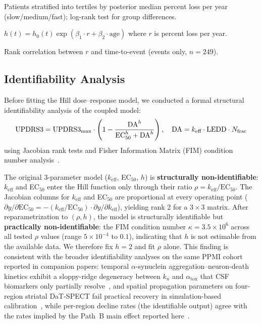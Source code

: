 \begin{description}[style=unboxed, leftmargin=0pt]
  \item[C1. Kaplan--Meier:] Patients stratified into tertiles by
    posterior median percent loss per year (slow/medium/fast);
    log-rank test for group differences.

  \item[C2. Cox PH:] $h(t) = h_0(t) \exp(\beta_1 \cdot r +
    \beta_2 \cdot \text{age})$ where $r$ is percent loss per year.

  \item[C4. Spearman:] Rank correlation between $r$ and time-to-event
    (events only, $n{=}249$).
\end{description}


\subsection{Identifiability Analysis}

Before fitting the Hill dose--response model, we conducted a formal
structural identifiability analysis of the coupled model:
\begin{equation}
  \text{UPDRS3} = \text{UPDRS3}_\text{max} \cdot \left(1 -
  \frac{\mathrm{DA}^h}{\text{EC}_{50}^h + \mathrm{DA}^h}\right),
  \quad \mathrm{DA} = k_\text{eff} \cdot \mathrm{LEDD} \cdot N_{\mathrm{frac}}
  \label{eq:hill}
\end{equation}
using Jacobian rank tests and Fisher Information Matrix (FIM) condition
number analysis~\cite{raue2009,villaverde2016}.

The original 3-parameter model ($k_\text{eff}$, EC$_{50}$, $h$) is
\textbf{structurally non-identifiable}: $k_\text{eff}$ and EC$_{50}$
enter the Hill function only through their ratio
$\rho = k_\text{eff}/\text{EC}_{50}$. The Jacobian columns for
$k_\text{eff}$ and EC$_{50}$ are proportional at every operating point
($\partial y/\partial \text{EC}_{50} = -(k_\text{eff}/\text{EC}_{50})
\cdot \partial y/\partial k_\text{eff}$), yielding rank 2 for a
$3 \times 3$ matrix. After reparametrization to $(\rho, h)$, the model
is structurally identifiable but \textbf{practically non-identifiable}:
the FIM condition number $\kappa{=}3.5 \times 10^6$ across all tested
$\rho$ values (range $5 \times 10^{-4}$ to $0.1$), indicating that $h$
is not estimable from the available data. We therefore fix $h{=}2$ and
fit $\rho$ alone. This finding is consistent with the broader
identifiability analyses on the same PPMI cohort reported in companion
papers: temporal $\alpha$-synuclein aggregation--neuron-death kinetics
exhibit a sloppy-ridge degeneracy between $k_n$ and $\alpha_\text{tox}$
that CSF biomarkers only partially resolve~\cite{dupre2026paper7}, and
spatial propagation parameters on four-region striatal DaT-SPECT fail
practical recovery in simulation-based calibration~\cite{dupre2026paper8a},
while per-region decline rates (the identifiable output) agree with
the rates implied by the Path~B main effect reported
here~\cite{dupre2026paper8b}.


